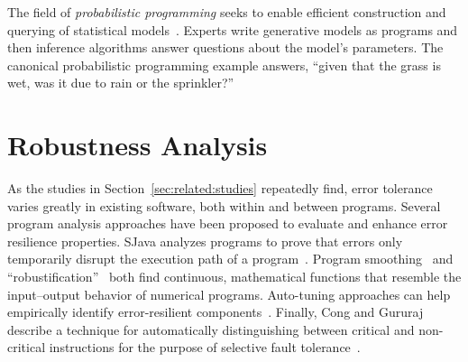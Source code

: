 The field of \emph{probabilistic programming} seeks to enable efficient
construction and querying of statistical models~\cite{BBGR13, wingate-lightweight,
  church, chaganty, pfeffersample, probdsl, koller}.  Experts write
generative models as programs and then inference algorithms answer questions
about the model's parameters. The canonical probabilistic programming example
answers, ``given that the grass is wet, was it due to rain or the sprinkler?''




\section{Robustness Analysis}

As the studies in Section~\ref{sec:related:studies} repeatedly find, error
tolerance varies greatly in existing software, both within and between
programs. Several program analysis approaches have been proposed to evaluate
and enhance error resilience properties. SJava analyzes programs to prove that
errors only temporarily disrupt the execution path of a program~\cite{sjava}.
Program smoothing~\cite{smoothing-cav, smoothing-pldi, smoothing-fse} and
``robustification''~\cite{robustification} both find continuous, mathematical
functions that resemble the input--output behavior of numerical programs.
Auto-tuning approaches can help empirically identify error-resilient
components~\cite{asac}.
Finally, Cong and Gururaj describe a technique for automatically
distinguishing between critical and non-critical instructions for the purpose
of selective fault tolerance~\cite{cong-iccad}.

